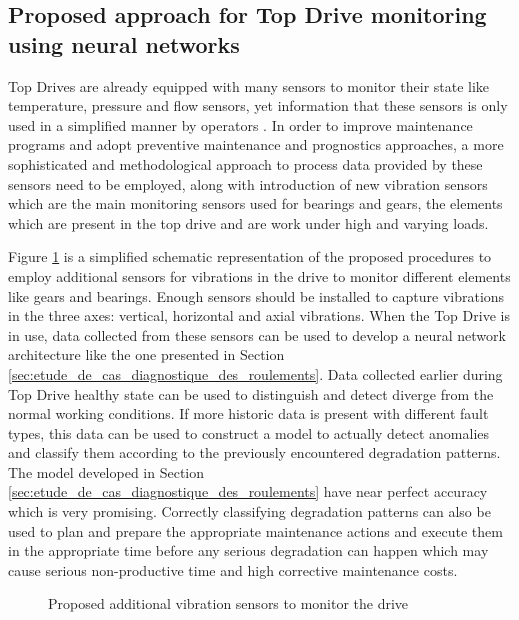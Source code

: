 \subsection{Proposed approach for Top Drive monitoring using neural networks}%
\label{sub:proposed_approach_for_top_drive_monitoring_using_neural_networks}

Top Drives are already equipped with many sensors to monitor their state like temperature, pressure and flow sensors, yet information that these sensors is only used in a simplified manner by operators \cite{Pournazari2016}. In order to improve maintenance programs and adopt preventive maintenance and prognostics approaches, a more sophisticated and methodological approach to process data provided by these sensors need to be employed, along with introduction of new vibration sensors which are the main monitoring sensors used for bearings and gears, the elements which are present in the top drive and are work under high and varying loads.

Figure \ref{fig:topdrive-drive-sensors} is a simplified schematic representation of the proposed procedures to employ additional sensors for vibrations in the drive to monitor different elements like gears and bearings. Enough sensors should be installed to capture vibrations in the three axes: vertical, horizontal and axial vibrations. When the Top Drive is in use, data collected from these sensors can be used to develop a neural network architecture like the one presented in Section \ref{sec:etude_de_cas_diagnostique_des_roulements}. Data collected earlier during Top Drive healthy state can be used to distinguish and detect diverge from the normal working conditions. If more historic data is present with different fault types, this data can be used to construct a model to actually detect anomalies and classify them according to the previously encountered degradation patterns. The model developed in Section \ref{sec:etude_de_cas_diagnostique_des_roulements} have near perfect accuracy which is very promising. Correctly classifying degradation patterns can also be used to plan and prepare the appropriate maintenance actions and execute them in the appropriate time before any serious degradation can happen which may cause serious non-productive time and high corrective maintenance costs. 

\begin{figure}[h]
	\centering
	
	\caption{Proposed additional vibration sensors to monitor the drive}%
	\label{fig:topdrive-drive-sensors}
\end{figure}




